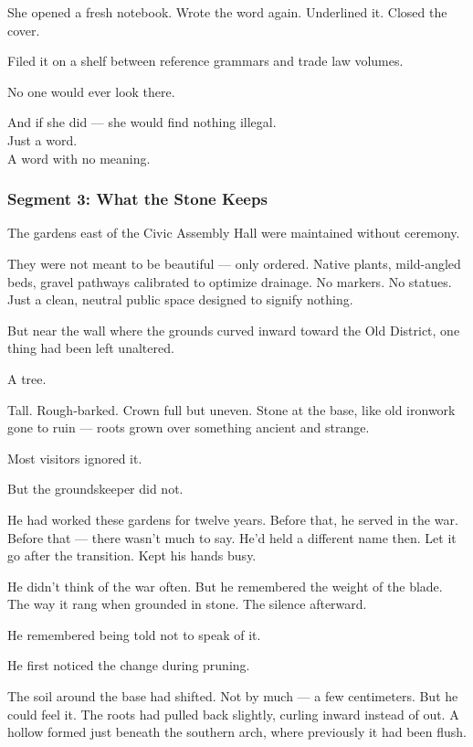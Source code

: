 \documentclass[9pt]{article}
\begin{document}
She opened a fresh notebook. Wrote the word again. Underlined it. Closed the cover.

Filed it on a shelf between reference grammars and trade law volumes.

No one would ever look there.

And if she did --- she would find nothing illegal.\\
Just a word.\\
A word with no meaning.


\newpage

\subsubsection*{Segment 3: What the Stone Keeps}

The gardens east of the Civic Assembly Hall were maintained without ceremony.

They were not meant to be beautiful --- only ordered. Native plants, mild-angled beds, gravel pathways calibrated to optimize drainage. No markers. No statues. Just a clean, neutral public space designed to signify nothing.

But near the wall where the grounds curved inward toward the Old District, one thing had been left unaltered.

A tree.

Tall. Rough-barked. Crown full but uneven. Stone at the base, like old ironwork gone to ruin --- roots grown over something ancient and strange.

Most visitors ignored it.

But the groundskeeper did not.

He had worked these gardens for twelve years. Before that, he served in the war. Before that --- there wasn’t much to say. He’d held a different name then. Let it go after the transition. Kept his hands busy.

He didn’t think of the war often. But he remembered the weight of the blade. The way it rang when grounded in stone. The silence afterward.

He remembered being told not to speak of it.

\vspace{1em}

He first noticed the change during pruning.

The soil around the base had shifted. Not by much --- a few centimeters. But he could feel it. The roots had pulled back slightly, curling inward instead of out. A hollow formed just beneath the southern arch, where previously it had been flush.
\end{document}
